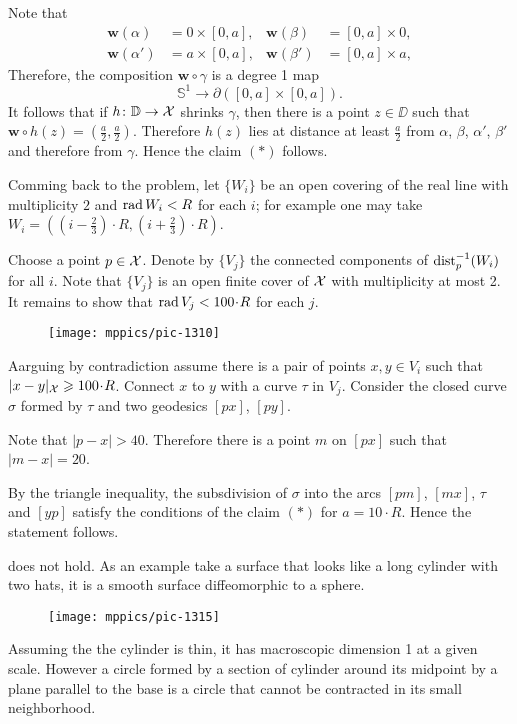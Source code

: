 Note that 
\begin{align*}
\bm{w}(\alpha)&=0\times [0,a],
&
\bm{w}(\beta)&=[0,a]\times 0,
\\
\bm{w}(\alpha')&=a\times [0,a],
&
\bm{w}(\beta')&=[0,a]\times a,
\end{align*} 
Therefore, the composition $\bm{w}\circ\gamma$ is a degree 1 map 
\[\mathbb{S}^1\to \partial([0,a]\times[0,a]).\] 
It follows that if $h\colon\mathbb{D}\to \mathcal{X}$ shrinks $\gamma$, then there is a point $z\in\DD$ such that 
$\bm{w}\circ h(z)=(\tfrac a2,\tfrac a2)$.
Therefore $h(z)$ lies at distance at least $\tfrac a2$ from $\alpha$, $\beta$, $\alpha'$, $\beta'$
and therefore from $\gamma$.
Hence the claim $({*})$ follows.

\medskip

Comming back to the problem, let $\{W_i\}$ be an open covering of the real line with multiplicity $2$ and $\mathop{\rm rad}\nolimits W_i<R$ for each $i$;
for example one may take $W_i=((i-\tfrac23)\cdot R,(i+\tfrac23)\cdot R)$.

Choose a point $p\in \mathcal{X}$.
Denote by $\{V_j\}$ the connected components of $\mathrm{dist}_p^{-1}(W_i)$ for all $i$.
Note that $\{V_j\}$ is an open finite cover of $\mathcal{X}$ with multiplicity at most 2.
It remains to show that $\rad V_j<100\cdot R$ for each $j$.

\begin{wrapfigure}{o}{31 mm}
\vskip-2mm
\centering
\texttt{[image: mppics/pic-1310]}
\end{wrapfigure}

Aarguing by contradiction assume there is a pair of points  $x,y\in V_i$ 
such that $|x\z-y|_{\spc{X}}\ge 100\cdot R$.
Connect $x$ to $y$ with a curve $\tau$ in $V_j$.
Consider the closed curve $\sigma$ formed by $\tau$ and two geodesics $[px]$, $[py]$.


Note that $|p-x|>40$.
Therefore there is a point $m$ on $[px]$ such that $|m-x|=20$.

By the triangle inequality, the subsdivision of $\sigma$ into the arcs $[pm]$, $[mx]$, $\tau$ and $[yp]$ satisfy the conditions of the claim $({*})$ for $a=10\cdot R$.
Hence the statement follows.

 does not hold.
As an example take a surface that looks like a long cylinder with two hats,
it is a smooth surface diffeomorphic to a sphere.
\begin{figure}[h!]
\vskip0mm
\centering
\texttt{[image: mppics/pic-1315]}
\end{figure}
Assuming the the cylinder is thin, it has macroscopic dimension 1 at a given scale.
However a circle formed by a section of cylinder around its midpoint by a plane parallel to the base is a circle that cannot be contracted in its small neighborhood.

